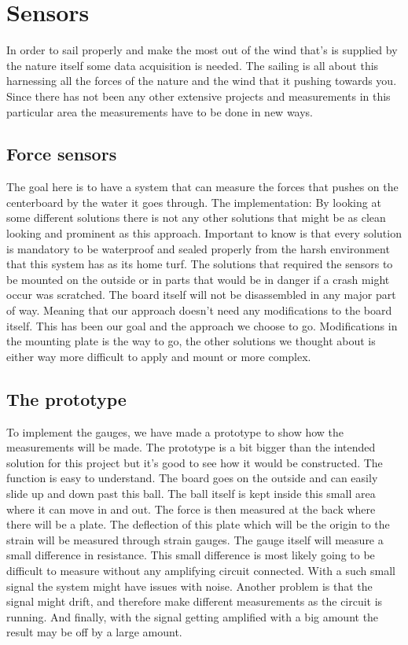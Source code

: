 
\section{Sensors}
In order to sail properly and make the most out of the wind that’s is supplied by the nature itself some data acquisition is needed. The sailing is all about this harnessing all the forces of the nature and the wind that it pushing towards you. Since there has not been any other extensive projects and measurements in this particular area the measurements have to be done in new ways. 

\subsection{Force sensors}

The goal here is to have a system that can measure the forces that pushes on the centerboard by the water it goes through. 
The implementation:
By looking at some different solutions there is not any other solutions that might be as clean looking and prominent as this approach. Important to know is that every solution is mandatory to be waterproof and sealed properly from the harsh environment that this system has as its home turf. The solutions that required the sensors to be mounted on the outside or in parts that would be in danger if a crash might occur was scratched.  
The board itself will not be disassembled in any major part of way. Meaning that our approach doesn’t need any modifications to the board itself. This has been our goal and the approach we choose to go. Modifications in the mounting plate is the way to go, the other solutions we thought about is either way more difficult to apply and mount or more complex.

\subsection{The prototype}
To implement the gauges, we have made a prototype to show how the measurements will be made. The prototype is a bit bigger than the intended solution for this project but it's good to see how it would be constructed. The function is easy to understand. The board goes on the outside and can easily slide up and down past this ball.  The ball itself is kept inside this small area where it can move in and out. The force is then measured at the back where there will be a plate. The deflection of this plate which will be the origin to the strain will be measured through strain gauges. 
The gauge itself will measure a small difference in resistance. This small difference is most likely going to be difficult to measure without any amplifying circuit connected. With a such small signal the system might have issues with noise. Another problem is that the signal might drift, and therefore make different measurements as the circuit is running. And finally, with the signal getting amplified with a big amount the result may be off by a large amount.
 
